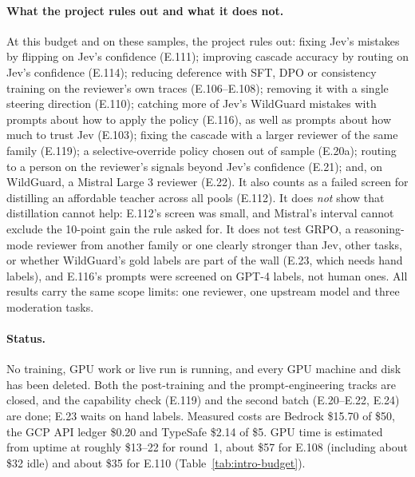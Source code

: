 \documentclass[11pt]{article}
\renewcommand{\_}{\origunderscore\allowbreak}
\begin{document}
\paragraph{What the project rules out and what it does not.} At this budget and on these samples, the project rules out: fixing Jev's mistakes by flipping on Jev's confidence (E.111); improving cascade accuracy by routing on Jev's confidence (E.114); reducing deference with SFT, DPO or consistency training on the reviewer's own traces (E.106--E.108); removing it with a single steering direction (E.110); catching more of Jev's WildGuard mistakes with prompts about how to apply the policy (E.116), as well as prompts about how much to trust Jev (E.103); fixing the cascade with a larger reviewer of the same family (E.119); a selective-override policy chosen out of sample (E.20a); routing to a person on the reviewer's signals beyond Jev's confidence (E.21); and, on WildGuard, a Mistral Large 3 reviewer (E.22). It also counts as a failed screen for distilling an affordable teacher across all pools (E.112). It does \emph{not} show that distillation cannot help: E.112's screen was small, and Mistral's interval cannot exclude the 10-point gain the rule asked for. It does not test GRPO, a reasoning-mode reviewer from another family or one clearly stronger than Jev, other tasks, or whether WildGuard's gold labels are part of the wall (E.23, which needs hand labels), and E.116's prompts were screened on GPT-4 labels, not human ones. All results carry the same scope limits: one reviewer, one upstream model and three moderation tasks.

\paragraph{Status.} No training, GPU work or live run is running, and every GPU machine and disk has been deleted. Both the post-training and the prompt-engineering tracks are closed, and the capability check (E.119) and the second batch (E.20--E.22, E.24) are done; E.23 waits on hand labels. Measured costs are Bedrock \$15.70 of \$50, the GCP API ledger \$0.20 and TypeSafe \$2.14 of \$5. GPU time is estimated from uptime at roughly \$13--22 for round~1, about \$57 for E.108 (including about \$32 idle) and about \$35 for E.110 (Table~\ref{tab:intro-budget}).
\end{document}
